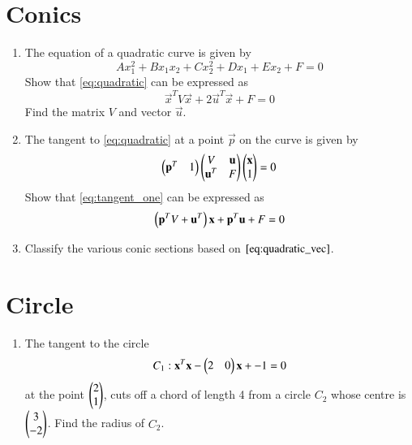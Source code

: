 \documentclass[journal,12pt,twocolumn]{IEEEtran}
\renewcommand\thesection{\arabic{section}}
\begin{document}
\section{Conics}
\begin{enumerate}[label=\thesection.\arabic*
,ref=\thesection.\theenumi]
\item The equation of a quadratic curve is given by
\begin{equation}
Ax_1^2+Bx_1x_2+Cx_2^2+Dx_1+Ex_2+F = 0
\label{eq:quadratic}
\end{equation}
%
Show that  \eqref{eq:quadratic} can be expressed as
\begin{equation}
\vec{x}^TV\vec{x}+2\vec{u}^T\vec{x}+ F = 0
\label{eq:quadratic_vec}
\end{equation}
%
Find the matrix $V$ and vector $\vec{u}$.
\item The tangent to \eqref{eq:quadratic} at a point $\vec{p}$ on the curve is given by
\begin{equation}
\begin{pmatrix}\mathbf{p}^T & 1\end{pmatrix}\begin{pmatrix}V & \mathbf{u} \\ \mathbf{u}^T & F\end{pmatrix} \begin{pmatrix}\mathbf{x} \\ 1\end{pmatrix} = 0
\label{eq:tangent_one}
\end{equation}
%
Show that \eqref{eq:tangent_one} can be expressed as
\begin{equation}
\left(\mathbf{p}^TV+\mathbf{u}^T\right)\mathbf{x} + \mathbf{p}^T\mathbf{u} +F = 0
\label{eq:tangent}
\end{equation}
\item Classify the various conic sections based on $\eqref{eq:quadratic_vec}$.
\\
\solution 
\begin{table}[!hb]
\centering

\caption{}
\label{table:conics}
\end{table}

\end{enumerate}
\section{Circle}
\begin{enumerate}[label=\thesection.\arabic*
,ref=\thesection.\theenumi]
\item The tangent to the circle
\begin{equation}
C_1: \mathbf{x}^T\mathbf{x} - \begin{pmatrix}2 & 0\end{pmatrix}\mathbf{x} + 
-1 = 0 
\end{equation}
%
at the point $\begin{pmatrix}2 \\1\end{pmatrix}$, cuts off a chord of length 4 from a circle $C_2$ whose centre is $\begin{pmatrix}3 \\ 
-2\end{pmatrix}$.  Find the radius of $C_2$.
\end{enumerate}
\end{document}
